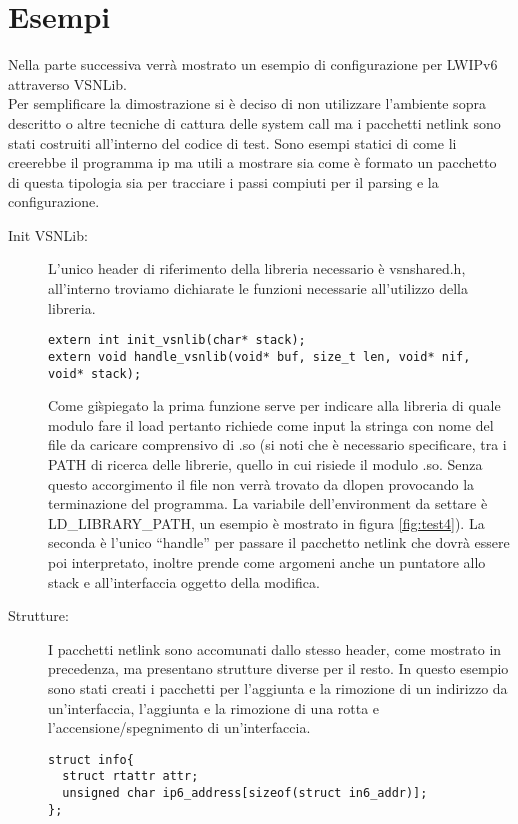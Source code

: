 \section{Esempi}                 %
Nella parte successiva verr\`a mostrato un esempio di configurazione per LWIPv6 attraverso VSNLib.\\
Per semplificare la dimostrazione si \`e deciso di non utilizzare l'ambiente sopra descritto o altre tecniche di cattura delle system call ma i pacchetti netlink sono stati costruiti all'interno del codice di test. Sono esempi statici di come li creerebbe il programma ip ma utili a mostrare sia come \`e formato un pacchetto di questa tipologia sia per tracciare i passi compiuti per il parsing e la configurazione.
\begin{description}
\item[Init VSNLib: ]L'unico header di riferimento della libreria necessario \`e vsnshared.h, all'interno troviamo dichiarate le funzioni necessarie all'utilizzo della libreria.
\begin{lstlisting}[style=CStyle]
extern int init_vsnlib(char* stack);
extern void handle_vsnlib(void* buf, size_t len, void* nif, void* stack);
\end{lstlisting}
Come gi\` spiegato la prima funzione serve per indicare alla libreria di quale modulo fare il load pertanto richiede come input la stringa con nome del file da caricare comprensivo di .so (si noti che \`e necessario specificare, tra i PATH di ricerca delle librerie, quello in cui risiede il modulo .so. Senza questo accorgimento il file non verr\`a trovato da dlopen provocando la terminazione del programma. La variabile dell'environment da settare \`e LD\_LIBRARY\_PATH, un esempio \`e mostrato in figura \ref{fig:test4}).
La seconda \`e l'unico ``handle'' per passare il pacchetto netlink che dovr\`a essere poi interpretato, inoltre prende come argomeni anche un puntatore allo stack e all'interfaccia oggetto della modifica.
\item[Strutture: ]I pacchetti netlink sono accomunati dallo stesso header, come mostrato in precedenza, ma presentano strutture diverse per il resto. In questo esempio sono stati creati i pacchetti per l'aggiunta e la rimozione di un indirizzo da un'interfaccia, l'aggiunta e la rimozione di una rotta e l'accensione/spegnimento di un'interfaccia.
\begin{lstlisting}[style=CStyle]
struct info{
  struct rtattr attr;
  unsigned char ip6_address[sizeof(struct in6_addr)];
};


\end{lstlisting}
\end{description}
